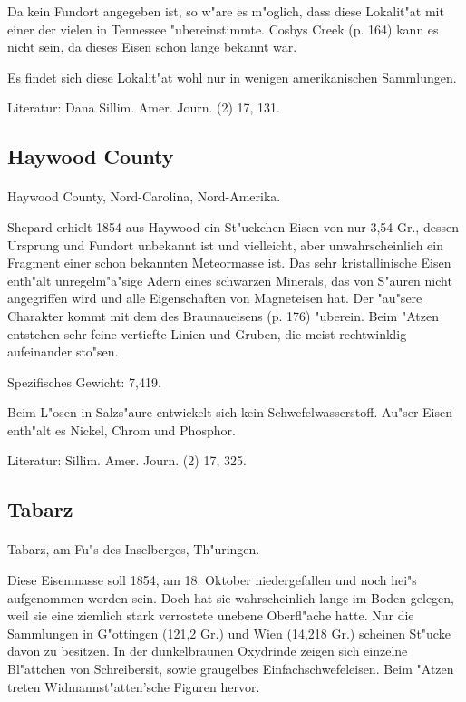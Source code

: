 \documentclass[a4paper, 11pt, oneside]{article}
\begin{document}
Da kein Fundort angegeben ist, so w"are es m"oglich, dass diese Lokalit"at mit einer der vielen in Tennessee "ubereinstimmte. Cosbys Creek (p. 164) kann es nicht sein, da dieses Eisen schon lange bekannt war.

Es findet sich diese Lokalit"at wohl nur in wenigen amerikanischen Sammlungen.

\footnotesize
Literatur: Dana Sillim. Amer. Journ. (2) 17, 131.

\subsection{Haywood County}
\normalsize
\paragraph{}
Haywood County, Nord-Carolina, Nord-Amerika.

Shepard erhielt 1854 aus Haywood ein St"uckchen Eisen von nur 3,54 Gr., dessen Ursprung und Fundort unbekannt ist und vielleicht, aber unwahrscheinlich ein Fragment einer schon bekannten Meteormasse ist. Das sehr kristallinische Eisen enth"alt unregelm"a"sige Adern eines schwarzen Minerals, das von S"auren nicht angegriffen wird und alle Eigenschaften von Magneteisen hat. Der "au"sere Charakter kommt mit dem des Braunaueisens (p. 176) "uberein. Beim "Atzen entstehen sehr feine vertiefte Linien und Gruben, die meist rechtwinklig aufeinander sto"sen.

Spezifisches Gewicht: 7,419.

Beim L"osen in Salzs"aure entwickelt sich kein Schwefelwasserstoff. Au"ser Eisen enth"alt es Nickel, Chrom und Phosphor.

\footnotesize
Literatur: Sillim. Amer. Journ. (2) 17, 325.

\subsection{Tabarz}
\normalsize
\paragraph{}
Tabarz, am Fu"s des Inselberges, Th"uringen.

Diese Eisenmasse soll 1854, am 18. Oktober niedergefallen und noch hei"s aufgenommen worden sein. Doch hat sie wahrscheinlich lange im Boden gelegen, weil sie eine ziemlich stark verrostete unebene Oberfl"ache hatte. Nur die Sammlungen in G"ottingen (121,2 Gr.) und Wien (14,218 Gr.) scheinen St"ucke davon zu besitzen. In der dunkelbraunen Oxydrinde zeigen sich einzelne Bl"attchen von Schreibersit, sowie graugelbes Einfachschwefeleisen. Beim "Atzen treten Widmannst"atten'sche Figuren hervor.
\end{document}
